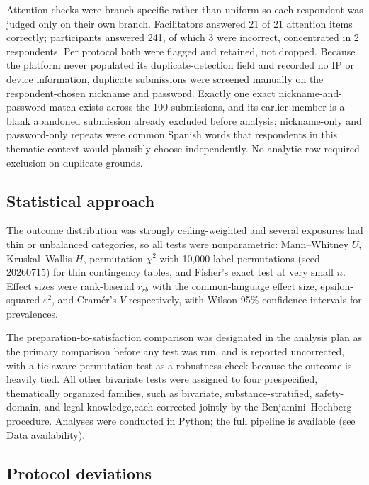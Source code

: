 \documentclass[12pt]{article}
\begin{document}
Attention checks were branch-specific rather than uniform so each respondent was judged only on their own branch. Facilitators answered 21 of 21
attention items correctly; participants answered 241, of which 3 were incorrect, concentrated in 2
respondents. Per protocol both were flagged and retained, not dropped. Because the platform never populated
its duplicate-detection field and recorded no IP or device information, duplicate submissions were screened
manually on the respondent-chosen nickname and password. Exactly one exact nickname-and-password match
exists across the 100 submissions, and its earlier member is a blank abandoned submission already excluded
before analysis; nickname-only and password-only repeats were common Spanish words that respondents in this
thematic context would plausibly choose independently. No analytic row required exclusion on duplicate
grounds.

\subsection{Statistical approach}

The outcome distribution was strongly ceiling-weighted and several exposures had thin or unbalanced
categories, so all tests were nonparametric: Mann--Whitney $U$, Kruskal--Wallis $H$, permutation $\chi^2$
with 10,000 label permutations (seed 20260715) for thin contingency tables, and Fisher's exact test at very
small $n$. Effect sizes were rank-biserial $r_{rb}$ with the common-language effect size, epsilon-squared
$\varepsilon^2$, and Cram\'er's $V$ respectively, with Wilson 95\% confidence intervals for prevalences.

The preparation-to-satisfaction comparison was designated in the analysis plan as the primary comparison
before any test was run, and is reported uncorrected, with a tie-aware permutation test as a robustness
check because the outcome is heavily tied. All other bivariate tests were assigned to four prespecified,
thematically organized families, such as bivariate, substance-stratified, safety-domain, and legal-knowledge,each
corrected jointly by the Benjamini--Hochberg procedure. Analyses were conducted
in Python; the full pipeline is available (see Data availability).

\subsection{Protocol deviations}
\end{document}
